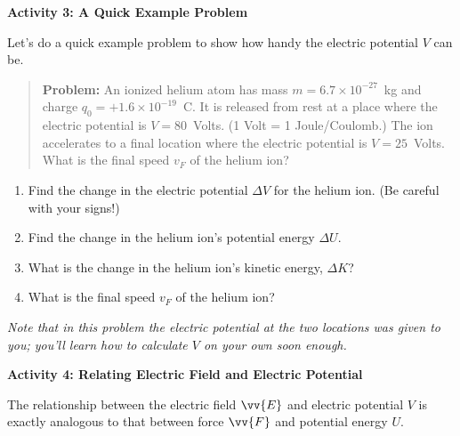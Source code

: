 \pagebreak[2]
\textbf{Activity 3: A Quick Example Problem}

Let's do a quick example problem to show how handy the electric potential $V$ can be.  
\begin{quote}
\textbf{Problem:} An ionized helium atom has mass $m=6.7\times 10^{-27}$~kg and charge $q_0=+1.6\times 10^{-19}$~C.  It is released from rest at a place where the electric potential is $V = 80$~Volts.  (1 Volt = 1 Joule/Coulomb.)  The ion accelerates to a final location where the electric potential is $V= 25$~Volts.  What is the final speed $v_F$ of the helium ion?  
\end{quote}
\begin{enumerate}[labparts]
\item Find the change in the electric potential $\Delta V$ for the helium ion.  (Be careful with your signs!)
\answerspace{0.3in}

\item Find the change in the helium ion's potential energy $\Delta U$.  
\answerspace{0.3in}

\item What is the change in the helium ion's kinetic energy, $\Delta K$? 
\answerspace{0.3in}

\item What is the final speed $v_F$ of the helium ion?
\answerspace{0.6in}

\end{enumerate}
\textit{Note that in this problem the electric potential at the two locations was given to you; you'll learn how to calculate $V$ on your own soon enough.}

\bigskip
\textbf{Activity 4: Relating Electric Field and Electric Potential}

The relationship between the electric field $\vv{E}$ and electric potential $V$ is exactly analogous to that between force $\vv{F}$ and potential energy $U$.  

